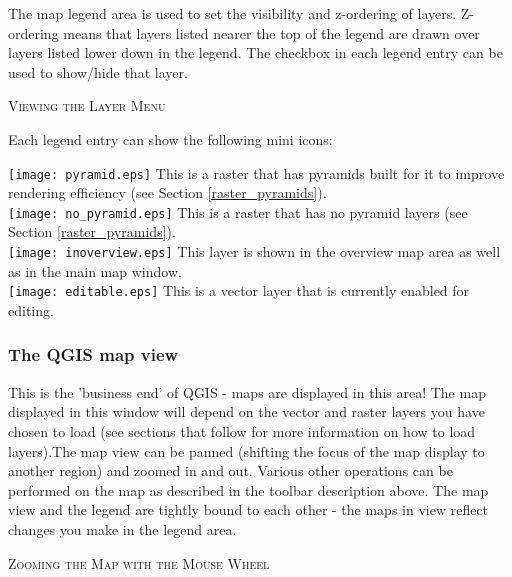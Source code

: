 The map legend area is used to set the visibility and z-ordering of layers.
Z-ordering means that layers listed nearer the top of the legend are drawn
over layers listed lower down in the legend. The checkbox in each legend
entry can be used to show/hide that layer.

\begin{Tip} \caption{\textsc{Viewing the Layer Menu}}
\end{Tip}

Each legend entry can show the following mini icons:

\texttt{[image: pyramid.eps]} This is a raster
that has pyramids built for it to improve rendering efficiency (see
Section \ref{raster_pyramids}).\\
\texttt{[image: no\_pyramid.eps]} This is a
raster that has no pyramid layers (see Section \ref{raster_pyramids}).\\
\texttt{[image: inoverview.eps]} This layer is
shown in the overview map area as well as in the main map window.\\
\texttt{[image: editable.eps]} This is a vector
layer that is currently enabled for editing.\\

\subsubsection{The QGIS map view}\label{label_mapview}

This is the 'business end' of QGIS - maps are displayed in this area! The
map displayed in this window will depend on the vector and raster layers you
have chosen to load (see sections that follow for more information on how to
load layers).The map view can be panned (shifting the focus of the map display
to another region) and zoomed in and out. Various other operations can be
performed on the map as described in the toolbar description above.  The map
view and the legend are tightly bound to each other - the maps in view reflect
changes you make in the legend area.  

\begin{Tip}\caption{\textsc{Zooming the Map with the Mouse
Wheel}}
\end{Tip}

